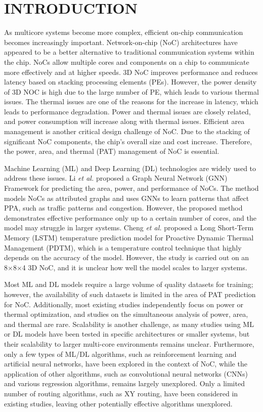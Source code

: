 \documentclass[conference]{IEEEtran}
\begin{document}
\section{INTRODUCTION}
As multicore systems become more complex, efficient
on-chip communication becomes increasingly important.
Network-on-chip (NoC) architectures have appeared to be a
better alternative to traditional communication systems within
the chip. NoCs allow multiple cores and components on a chip
to communicate more effectively and at higher speeds.
3D NoC improves performance and reduces latency based
on stacking processing elements (PEs). However, the power
density of 3D NOC is high due to the large number of PE,
which leads to various thermal issues. The thermal issues are
one of the reasons for the increase in latency, which leads to
performance degradation. Power and thermal issues are closely
related, and power consumption will increase along with
thermal issues. Efficient area management is another critical
design challenge of NoC. Due to the stacking of significant
NoC components, the chip’s overall size and cost increase.
Therefore, the power, area, and thermal (PAT) management of
NoC is essential. 

Machine Learning (ML) and Deep Learning
(DL) technologies are widely used to address these issues. Li \textit{et al.}\cite{7} proposed a Graph Neural Network (GNN) Framework for predicting the area, power, and performance of NoCs. The method models NoCs as attributed graphs and uses GNNs to learn patterns that affect PPA, such as traffic patterns and congestion. However, the proposed method demonstrates effective performance only up to a certain number of cores, and the model may struggle in larger systems. Cheng \textit{et al.}\cite{12} proposed a Long Short-Term Memory (LSTM) temperature prediction model for Proactive Dynamic Thermal Management (PDTM), which is a temperature control technique that highly depends on the accuracy of the model. However, the study is carried out on an 8×8×4 3D NoC, and it is unclear how well the model scales to larger systems.

Most ML and DL models require a large volume of quality datasets for training; however, the availability of such datasets is limited in the area of PAT prediction for NoC. Additionally, most existing studies independently focus on power or thermal optimization, and studies on the simultaneous analysis of power, area, and thermal are rare. Scalability is another challenge, as many studies using ML or DL models have been tested in specific architectures or smaller systems, but their scalability to larger multi-core environments remains unclear. Furthermore, only a few types of ML/DL algorithms, such as reinforcement learning and artificial neural networks, have been explored in the context of NoC, while the application of other algorithms, such as convolutional neural networks (CNNs) and various regression algorithms, remains largely unexplored. Only a limited number of routing algorithms, such as XY routing, have been considered in existing studies, leaving other potentially effective algorithms unexplored.
\end{document}
